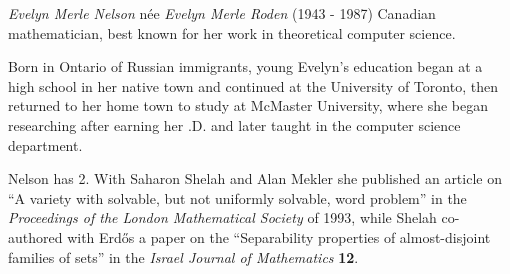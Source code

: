 \documentclass[12pt]{article}
\begin{document}

\emph{Evelyn Merle Nelson} n\'ee \emph{Evelyn Merle Roden} (1943 - 1987) Canadian mathematician, best known for her work in theoretical computer science.

Born in Ontario of Russian immigrants, young Evelyn's education began at a high school in her native town and continued at the University of Toronto, then returned to her home town to study at McMaster University, where she began researching after earning her .D. and later taught in the computer science department.

Nelson has  2. With Saharon Shelah and Alan Mekler she published an article on ``A variety with solvable, but not uniformly solvable, word problem'' in the {\it Proceedings of the London Mathematical Society} of 1993, while Shelah co-authored with Erd\H{o}s a paper on the ``Separability properties of almost-disjoint families of sets'' in the {\it Israel Journal of Mathematics} {\bf 12}.

\end{document}
